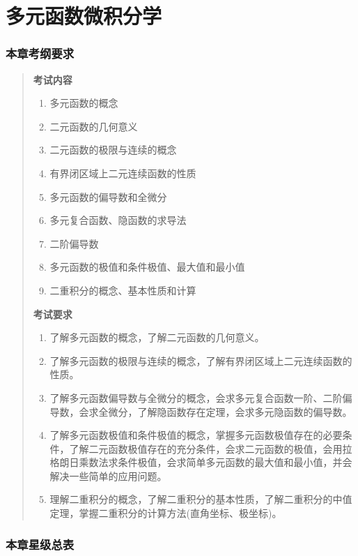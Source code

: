 \documentclass[11pt,openany,UTF8]{ctexbook}
\begin{document}
\chapter{多元函数微积分学}
\subsection*{本章考纲要求}

\begin{quote}
\textbf{考试内容}

\begin{enumerate}
\item 多元函数的概念
\item 二元函数的几何意义
\item 二元函数的极限与连续的概念
\item 有界闭区域上二元连续函数的性质
\item 多元函数的偏导数和全微分
\item 多元复合函数、隐函数的求导法
\item 二阶偏导数
\item 多元函数的极值和条件极值、最大值和最小值
\item 二重积分的概念、基本性质和计算
\end{enumerate}
\textbf{考试要求}

\begin{enumerate}
\item 了解多元函数的概念，了解二元函数的几何意义。
\item 了解多元函数的极限与连续的概念，了解有界闭区域上二元连续函数的性质。
\item 了解多元函数偏导数与全微分的概念，会求多元复合函数一阶、二阶偏导数，会求全微分，了解隐函数存在定理，会求多元隐函数的偏导数。
\item 了解多元函数极值和条件极值的概念，掌握多元函数极值存在的必要条件，了解二元函数极值存在的充分条件，会求二元函数的极值，会用拉格朗日乘数法求条件极值，会求简单多元函数的最大值和最小值，并会解决一些简单的应用问题。
\item 理解二重积分的概念，了解二重积分的基本性质，了解二重积分的中值定理，掌握二重积分的计算方法(直角坐标、极坐标)。
\end{enumerate}
\end{quote}
\subsection*{本章星级总表}
\end{document}
